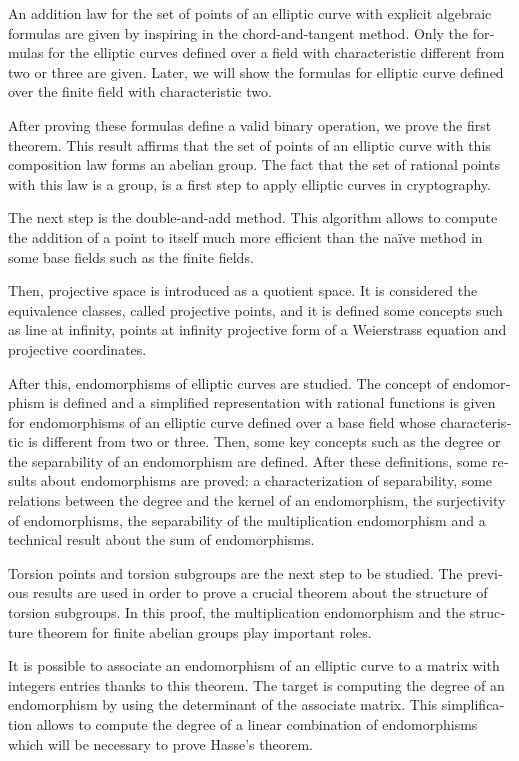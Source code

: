 \begin{otherlanguage}{american}
An addition law for the set of points of an elliptic curve with explicit algebraic formulas are given by inspiring in the chord-and-tangent method. Only the formulas for the elliptic curves defined over a field with characteristic different from two or three are given. Later, we will show the formulas for elliptic curve defined over the finite field with characteristic two.

After proving these formulas define a valid binary operation, we prove the first theorem. This result affirms that the set of points of an elliptic curve with this composition law forms an abelian group. The fact that the set of rational points with this law is a group, is a first step to apply elliptic curves in cryptography.

The next step is the double-and-add method. This algorithm allows to compute the addition of a point to itself much more efficient than the naïve method in some base fields such as the finite fields.

Then, projective space is introduced as a quotient space. It is considered the equivalence classes, called projective points, and it is defined some concepts such as line at infinity, points at infinity projective form of a Weierstrass equation and projective coordinates.

After this, endomorphisms of elliptic curves are studied. The concept of endomorphism is defined and a simplified representation with rational functions is given for endomorphisms of an elliptic curve defined over a base field whose characteristic is different from two or three. Then, some key concepts such as the degree or the separability of an endomorphism are defined. After these definitions, some results about endomorphisms are proved: a characterization of separability, some relations between the degree and the kernel of an endomorphism,  the surjectivity of endomorphisms, the separability of the multiplication endomorphism and a technical result about the sum of endomorphisms.

Torsion points and torsion subgroups are the next step to be studied. The previous results are used in order to prove a crucial theorem about the structure of torsion subgroups. In this proof, the multiplication endomorphism and the structure theorem for finite abelian groups play important roles.

It is possible to associate an endomorphism of an elliptic curve to a matrix with integers entries thanks to this theorem. The target is computing the degree of an endomorphism by using the determinant of the associate matrix. This simplification allows to compute the degree of a linear combination of endomorphisms which will be necessary to prove Hasse's theorem.


\end{otherlanguage}
